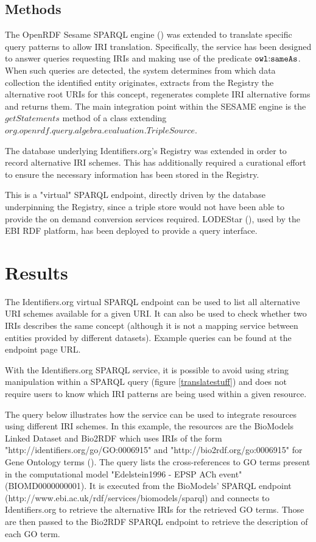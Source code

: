\documentclass{bioinfo}
\begin{document}
\begin{methods}
\section{Methods}
The OpenRDF Sesame SPARQL engine (\cite{SESAME}) was extended to translate specific query patterns to allow IRI translation. Specifically, the service has been designed to answer queries requesting IRIs and making use of the predicate $\mathtt{owl\text{\rm :}{}sameAs}$. When such queries are detected, the system determines from which data collection the identified entity originates, extracts from the Registry the alternative root URIs for this concept, regenerates complete IRI alternative forms and returns them. The main integration point within the SESAME engine is the $getStatements$ method of a class extending $org.openrdf.query.algebra.evaluation.TripleSource$.

The database underlying Identifiers.org's Registry was extended in order to record alternative IRI schemes. This has additionally required a curational effort to ensure the necessary information has been stored in the Registry.

This is a "virtual" SPARQL endpoint, directly driven by the database underpinning the Registry, since a triple store would not have been able to provide the on demand conversion services required. LODEStar (\cite{LODEStar}), used by the EBI RDF platform, has been deployed to provide a query interface.
\end{methods}

\section{Results}
The Identifiers.org virtual SPARQL endpoint can be used to list all alternative URI schemes available for a given URI. It can also be used to check whether two IRIs describes the same concept (although it is not a mapping service between entities provided by different datasets). Example queries can be found at the endpoint page URL.

With the Identifiers.org SPARQL service, it is possible to avoid using string manipulation within a SPARQL query (figure \ref{translatestuff}) and does not require users to know which IRI patterns are being used within a given resource.

The query below illustrates how the service can be used to integrate resources using different IRI schemes. In this example, the resources are the BioModels Linked Dataset and Bio2RDF which uses IRIs of the form "http://identifiers.org/go/GO:0006915" and "http://bio2rdf.org/go:0006915" for Gene Ontology terms (\cite{Ashburner2000}). The query lists the cross-references to GO terms present in the computational model "Edelstein1996 - EPSP ACh event" (BIOMD0000000001). It is executed from the BioModels' SPARQL endpoint (http://www.ebi.ac.uk/rdf/services/biomodels/sparql) and connects to Identifiers.org to retrieve the alternative IRIs for the retrieved GO terms. Those are then passed to the Bio2RDF SPARQL endpoint to retrieve the description of each GO term.
\end{document}
